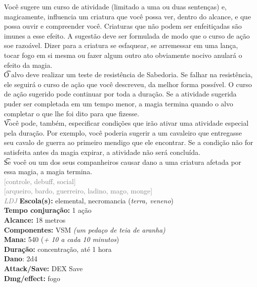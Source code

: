 \documentclass{RPG_Adventure}[2021/10/20]
\begin{document}
{\normalsize Você sugere um curso de atividade (limitado a uma ou duas sentenças) e, magicamente, influencia um criatura que você possa ver, dentro do alcance, e que possa ouvir e compreender você. Criaturas que não podem ser enfeitiçadas são imunes a esse efeito. A sugestão deve ser formulada de modo que o curso de ação soe razoável. Dizer para a criatura se esfaquear, se arremessar em uma lança, tocar fogo em si mesma ou fazer algum outro ato obviamente nocivo anulará o efeito da magia.\\\t O alvo deve realizar um teste de resistência de Sabedoria. Se falhar na resistência, ele seguirá o curso de ação que você descreveu, da melhor forma possível. O curso de ação sugerido pode continuar por toda a duração. Se a atividade sugerida puder ser completada em um tempo menor, a magia termina quando o alvo completar o que lhe foi dito para que fizesse.\\\t Você pode, também, especificar condições que irão ativar uma atividade especial pela duração. Por exemplo, você poderia sugerir a um cavaleiro que entregasse seu cavalo de guerra ao primeiro mendigo que ele encontrar. Se a condição não for satisfeita antes da magia expirar, a atividade não será concluída.\\\t Se você ou um dos seus companheiros causar dano a uma criatura afetada por essa magia, a magia termina.\\}
{\scriptsize \textcolor{gray}{[controle, debuff, social]\\}}
{\scriptsize \textcolor{gray}{[arqueiro, bardo, guerreiro, ladino, mago, monge]\\}}
{\tiny \textcolor{gray}{\textit{LDJ}}}\jump{}
{\small \t \textbf{Escola(s):} elemental, necromancia (\textit{terra, veneno})\\\t \textbf{Tempo conjuração:} 1 ação\\\t \textbf{Alcance:} 18 metros\\\t \textbf{Componentes:} VSM \textit{(um pedaço de teia de aranha)}\\\t \textbf{Mana:} 540 (\textit{+ 10 a cada 10 minutos})\\\t \textbf{Duração:} concentração, até 1 hora\\\t \textbf{Dano}: 2d4\\\t \textbf{Attack/Save:} DEX Save\\\t \textbf{Dmg/effect:} fogo\\}
\end{document}
